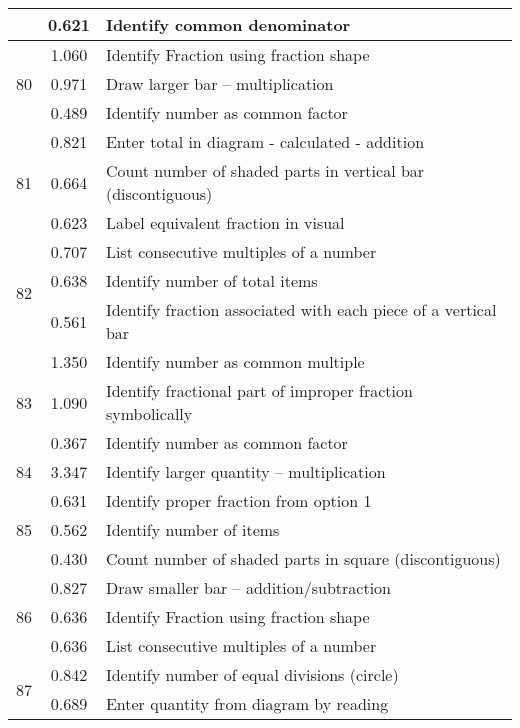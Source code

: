 \begin{longtable}[c]{|c|c|l|}
 & \small 0.621 & \small Identify common denominator \\
\hline
\multirow{3}{*}{\small 80} & \small 1.060 & \small Identify Fraction using fraction shape \\
 & \small 0.971 & \small Draw larger bar -- multiplication \\
 & \small 0.489 & \small Identify number as common factor \\
\hline
\multirow{3}{*}{\small 81} & \small 0.821 & \small Enter total in diagram - calculated - addition \\
 & \small 0.664 & \small Count number of shaded parts in vertical bar (discontiguous) \\
 & \small 0.623 & \small Label equivalent fraction in visual \\
\hline
\multirow{3}{*}{\small 82} & \small 0.707 & \small List consecutive multiples of a number \\
 & \small 0.638 & \small Identify number of total items \\
 & \small 0.561 & \small Identify fraction associated with each piece of a vertical bar \\
\hline
\multirow{3}{*}{\small 83} & \small 1.350 & \small Identify number as common multiple \\
 & \small 1.090 & \small Identify fractional part of improper fraction symbolically \\
 & \small 0.367 & \small Identify number as common factor \\
\hline
\multirow{1}{*}{\small 84} & \small 3.347 & \small Identify larger quantity -- multiplication \\
\hline
\multirow{3}{*}{\small 85} & \small 0.631 & \small Identify proper fraction from option 1 \\
 & \small 0.562 & \small Identify number of items \\
 & \small 0.430 & \small Count number of shaded parts in square (discontiguous) \\
\hline
\multirow{3}{*}{\small 86} & \small 0.827 & \small Draw smaller bar -- addition/subtraction \\
 & \small 0.636 & \small Identify Fraction using fraction shape \\
 & \small 0.636 & \small List consecutive multiples of a number \\
\hline
\multirow{3}{*}{\small 87} & \small 0.842 & \small Identify number of equal divisions (circle) \\
 & \small 0.689 & \small Enter quantity from diagram by reading \\

\end{longtable}
